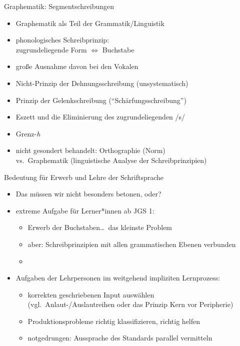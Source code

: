 \begin{frame}
  {Graphematik: Segmentschreibungen}
  \pause
  \begin{itemize}[<+->]
    \item Graphematik als Teil der Grammatik\slash Linguistik
      \Halbzeile
    \item \alert{phonologisches Schreibprinzip}:\\
      zugrundeliegende Form $\Leftrightarrow$ Buchstabe
    \item große Ausnahme davon bei den Vokalen 
      \Halbzeile
    \item Nicht-Prinzip der Dehnungsschreibung (unsystematisch)
    \item \alert{Prinzip der Gelenkschreibung} ("`Schärfungsschreibung"')
      \Halbzeile
    \item Eszett und die Eliminierung des zugrundeliegenden /s/
    \item Grenz-\textit{h}
      \Halbzeile
    \item nicht gesondert behandelt: \alert{Orthographie} (Norm)\\
      vs.\ \alert{Graphematik} (linguistische Analyse der Schreibprinzipien)
  \end{itemize}
\end{frame}

\begin{frame}
  {Bedeutung für Erwerb und Lehre der Schriftsprache}
  \pause
  \begin{itemize}[<+->]
    \item Das müssen wir nicht besonders betonen, oder?
      \Halbzeile
    \item extreme Aufgabe für Lerner*innen ab JGS 1:
      \begin{itemize}[<+->]
        \item Erwerb der Buchstaben\ldots\ das kleinste Problem
        \item aber: Schreibprinzipien mit allen grammatischen Ebenen verbunden
        \item {}
      \end{itemize}
      \Halbzeile
    \item Aufgaben der Lehrpersonen im weitgehend impliziten Lernprozess:
      \begin{itemize}[<+->]
        \item \alert{korrekten geschriebenen Input auswählen}\\
          (vgl.\ Anlaut-\slash Auslautreihen oder das Prinzip \alert{Kern vor Peripherie})
        \item \alert{Produktionsprobleme richtig klassifizieren, richtig helfen}
        \item notgedrungen: \alert{Aussprache des Standards parallel vermitteln}
      \end{itemize}
  \end{itemize}
\end{frame}


